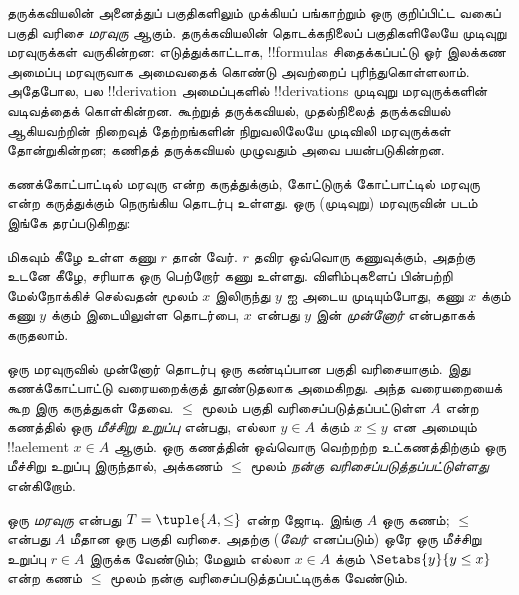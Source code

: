 \documentclass[../../../include/open-logic-section]{subfiles}
\begin{document}

தருக்கவியலின் அனைத்துப் பகுதிகளிலும் முக்கியப் பங்காற்றும் ஒரு குறிப்பிட்ட
வகைப் பகுதி வரிசை \emph{மரவுரு} ஆகும். தருக்கவியலின் தொடக்கநிலைப்
பகுதிகளிலேயே முடிவுறு மரவுருக்கள் வருகின்றன: எடுத்துக்காட்டாக,
!!{formula}s சிதைக்கப்பட்டு ஓர் இலக்கண அமைப்பு மரவுருவாக
அமைவதைக் கொண்டு அவற்றைப் புரிந்துகொள்ளலாம். அதேபோல, பல
!!{derivation} அமைப்புகளில் !!{derivation}s முடிவுறு மரவுருக்களின்
வடிவத்தைக் கொள்கின்றன.
%
கூற்றுத் தருக்கவியல், முதல்நிலைத் தருக்கவியல் ஆகியவற்றின் நிறைவுத்
தேற்றங்களின் நிறுவலிலேயே முடிவிலி மரவுருக்கள் தோன்றுகின்றன;
கணிதத் தருக்கவியல் முழுவதும் அவை பயன்படுகின்றன.

கணக்கோட்பாட்டில் மரவுரு என்ற கருத்துக்கும், கோட்டுருக் கோட்பாட்டில் மரவுரு
என்ற கருத்துக்கும் நெருங்கிய தொடர்பு உள்ளது. ஒரு (முடிவுறு) மரவுருவின்
படம் இங்கே தரப்படுகிறது:

\begin{center}
\end{center}

மிகவும் கீழே உள்ள கணு $r$ தான் வேர். $r$ தவிர ஒவ்வொரு கணுவுக்கும்,
அதற்கு உடனே கீழே, சரியாக ஒரு பெற்றோர் கணு உள்ளது.
விளிம்புகளைப் பின்பற்றி மேல்நோக்கிச் செல்வதன் மூலம் $x$ இலிருந்து $y$ ஐ
அடைய முடியும்போது, கணு $x$ க்கும் கணு $y$ க்கும் இடையிலுள்ள தொடர்பை,
$x$ என்பது $y$ இன் \emph{முன்னோர்} என்பதாகக் கருதலாம்.

ஒரு மரவுருவில் முன்னோர் தொடர்பு ஒரு கண்டிப்பான பகுதி வரிசையாகும்.
இது கணக்கோட்பாட்டு வரையறைக்குத் தூண்டுதலாக அமைகிறது. அந்த வரையறையைக்
கூற இரு கருத்துகள் தேவை. $\le$ மூலம் பகுதி வரிசைப்படுத்தப்பட்டுள்ள
$A$ என்ற கணத்தில் ஒரு \emph{மீச்சிறு உறுப்பு} என்பது, எல்லா
$y \in A$ க்கும் $x \le y$ என அமையும் !!a{element} $x \in A$ ஆகும்.
ஒரு கணத்தின் ஒவ்வொரு வெற்றற்ற உட்கணத்திற்கும் ஒரு மீச்சிறு உறுப்பு
இருந்தால், அக்கணம் $\le$ மூலம் \emph{நன்கு வரிசைப்படுத்தப்பட்டுள்ளது}
என்கிறோம்.

\begin{defn}[மரவுரு]
ஒரு \emph{மரவுரு} என்பது $T = \tuple{A, \le}$ என்ற ஜோடி.
இங்கு $A$ ஒரு கணம்; $\le$ என்பது $A$ மீதான ஒரு பகுதி வரிசை.
அதற்கு (\emph{வேர்} எனப்படும்) ஒரே ஒரு மீச்சிறு உறுப்பு
$r \in A$ இருக்க வேண்டும்; மேலும் எல்லா $x \in A$ க்கும்
$\Setabs{y}{y \le x}$ என்ற கணம் $\le$ மூலம் நன்கு வரிசைப்படுத்தப்பட்டிருக்க
வேண்டும்.
\end{defn}
\end{document}

